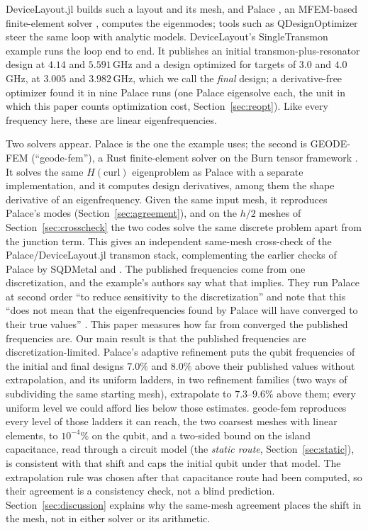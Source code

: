 \documentclass{anvil-paper}
\begin{document}
DeviceLayout.jl \citep{devicelayout} builds such a layout and its mesh, and
Palace \citep{palace}, an MFEM-based finite-element solver \citep{mfem},
computes the eigenmodes; tools such as QDesignOptimizer
\citep{eriksson2025automated} steer the same loop with analytic models.
DeviceLayout's SingleTransmon example
\citep{devicelayout-blog,devicelayout-example} runs the loop end to end. It
publishes an initial transmon-plus-resonator design at $4.14$ and
$5.591$\,GHz and a design optimized for targets of $3.0$ and $4.0$\,GHz, at
$3.005$ and $3.982$\,GHz, which we call the \emph{final} design; a
derivative-free optimizer found it in nine Palace runs (one Palace
eigensolve each, the unit in which this paper counts optimization cost,
Section~\ref{sec:reopt}). Like every frequency here, these are linear
eigenfrequencies.

Two solvers appear. Palace is the one the example uses; the second is
GEODE-FEM (``geode-fem''), a Rust finite-element solver on the Burn tensor
framework \citep{burn}. It solves the same
$H(\mathrm{curl})$ eigenproblem as Palace with a separate implementation,
and it computes design derivatives, among them the shape derivative of an
eigenfrequency. Given the same input mesh, it reproduces Palace's modes
(Section~\ref{sec:agreement}), and on the $h/2$ meshes of
Section~\ref{sec:crosscheck} the two codes solve the same discrete problem
apart from the junction term. This gives an independent
same-mesh cross-check of the Palace/DeviceLayout.jl transmon stack,
complementing the earlier checks of Palace by SQDMetal
\citep{sommers2025open} and \citet{ye2025electromagnetic}.
The published frequencies come from one discretization, and the example's
authors say what that implies. They run Palace at second order ``to reduce
sensitivity to the discretization'' and note that this ``does not mean that
the eigenfrequencies found by Palace will have converged to their true
values'' \citep{devicelayout-example}. This paper measures
how far from converged the published frequencies are. Our
main result is that the published frequencies are discretization-limited.
Palace's adaptive refinement puts the qubit frequencies of the initial and
final designs $7.0\%$ and $8.0\%$ above their published values without
extrapolation, and its
uniform ladders, in two refinement families (two ways of subdividing the
same starting mesh), extrapolate to $7.3$--$9.6\%$ above them;
every uniform level we could afford lies below those estimates. geode-fem
reproduces every level of those ladders it can reach, the two coarsest
meshes with linear elements, to $10^{-4}\%$ on the qubit, and a
two-sided bound on the island capacitance, read through a circuit model
(the \emph{static route}, Section~\ref{sec:static}), is consistent with
that shift and caps the initial qubit under that model. The extrapolation
rule was chosen after that capacitance route had been computed, so their
agreement is a consistency check, not a blind prediction.
Section~\ref{sec:discussion} explains why the same-mesh agreement places
the shift in the mesh, not in either solver or its arithmetic.
\end{document}
